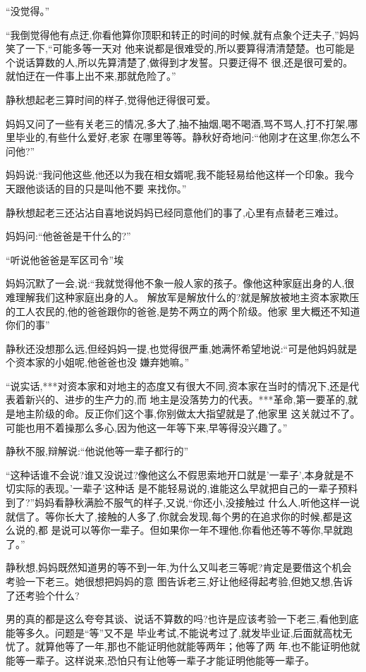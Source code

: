 ﻿\documentclass[12pt]{article}
\begin{document}
``没觉得。''

``我倒觉得他有点迂,你看他算你顶职和转正的时间的时候,就有点象个迂夫子,''妈妈笑了一下,``可能多等一天对
他来说都是很难受的,所以要算得清清楚楚。也可能是个说话算数的人,所以先算清楚了,做得到才发誓。只要迂得不
很,还是很可爱的。就怕迂在一件事上出不来,那就危险了。''

静秋想起老三算时间的样子,觉得他迂得很可爱。

妈妈又问了一些有关老三的情况,多大了,抽不抽烟,喝不喝酒,骂不骂人,打不打架,哪里毕业的,有些什么爱好,老家
在哪里等等。静秋好奇地问:``他刚才在这里,你怎么不问他?''

妈妈说:``我问他这些,他还以为我在相女婿呢,我不能轻易给他这样一个印象。我今天跟他谈话的目的只是叫他不要
来找你。''

静秋想起老三还沾沾自喜地说妈妈已经同意他们的事了,心里有点替老三难过。

妈妈问:``他爸爸是干什么的?''

``听说他爸爸是军区司令\myrule ''埃

妈妈沉默了一会,说:``我就觉得他不象一般人家的孩子。像他这种家庭出身的人,很难理解我们这种家庭出身的人。
解放军是解放什么的?就是解放被地主资本家欺压的工人农民的,他的爸爸跟你的爸爸,是势不两立的两个阶级。他家
里大概还不知道你们的事\myrule ''

静秋还没想那么远,但经妈妈一提,也觉得很严重,她满怀希望地说:``可是他妈妈就是个资本家的小姐呢,他爸爸也没
嫌弃她嘛。''

``说实话,***对资本家和对地主的态度又有很大不同,资本家在当时的情况下,还是代表着新兴的、进步的生产力的,而
地主是没落势力的代表。***革命,第一要革的,就是地主阶级的命。反正你们这个事,你别做太大指望就是了,他家里
这关就过不了。可能也用不着操那么多心,因为他这一年等下来,早\myrule 等得没兴趣了。''

静秋不服,辩解说:``他说他等一辈子都行的\myrule ''

``这种话谁不会说?谁又没说过?像他这么不假思索地开口就是'一辈子',本身就是不切实际的表现。'一辈子'这种话
是不能轻易说的,谁能这么早就把自己的一辈子预料到了?''妈妈看静秋满脸不服气的样子,又说,``你还小,没接触过
什么人,听他这样一说就信了。等你长大了,接触的人多了,你就会发现,每个男的在追求你的时候,都是这么说的,都
是说可以等你一辈子。但如果你一年不理他,你看他还等不等你,早就跑了。''

静秋想,妈妈既然知道男的等不到一年,为什么又叫老三等呢?肯定是要借这个机会考验一下老三。她很想把妈妈的意
图告诉老三,好让他经得起考验,但她又想,告诉了还考验个什么?

男的真的都是这么夸夸其谈、说话不算数的吗?也许是应该考验一下老三,看他到底能等多久。问题是``等''又不是
毕业考试,不能说考过了,就发毕业证,后面就高枕无忧了。就算他等了一年,那也不能证明他就能等两年；他等了两
年,也不能证明他就能等一辈子。这样说来,恐怕只有让他等一辈子才能证明他能等一辈子。
\end{document}

